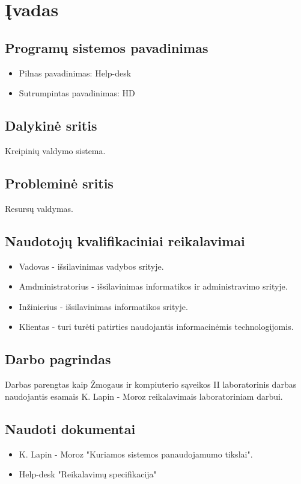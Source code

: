 ﻿\section{Įvadas}
	
	\subsection{Programų sistemos pavadinimas}
	
	\begin{itemize}
	\item Pilnas pavadinimas: Help-desk
	\item Sutrumpintas pavadinimas: HD
	\end{itemize}
	
	\subsection{Dalykinė sritis}
	
	Kreipinių valdymo sistema.
	
	\subsection{Probleminė sritis}
	
	Resursų valdymas.
	
	\subsection{Naudotojų kvalifikaciniai reikalavimai}
	
	\begin{itemize}
	\item Vadovas - išsilavinimas vadybos srityje.
	\item Amdministratorius - išsilavinimas informatikos ir administravimo srityje.
	\item Inžinierius - išsilavinimas informatikos srityje.
	\item Klientas - turi turėti patirties naudojantis informacinėmis technologijomis.
	\end{itemize}
	
	\subsection{Darbo pagrindas}
	
	Darbas parengtas kaip Žmogaus ir kompiuterio sąveikos II laboratorinis darbas naudojantis esamais K. Lapin - Moroz reikalavimais laboratoriniam darbui.
	
	\subsection{Naudoti dokumentai}
	
	\begin{itemize}
	\item K. Lapin - Moroz "Kuriamos sistemos panaudojamumo tikslai".
	\item Help-desk "Reikalavimų specifikacija"
	\end{itemize}
	